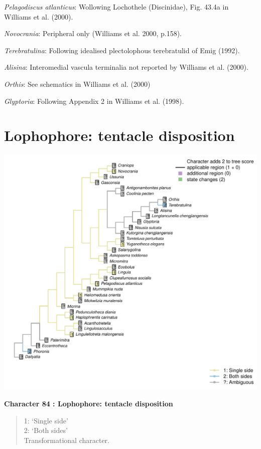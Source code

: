 \documentclass[]{book}
\theoremstyle{definition}
\theoremstyle{definition}
\theoremstyle{definition}
\theoremstyle{remark}
\begin{document}
\emph{Pelagodiscus atlanticus}: Wollowing Lochothele (Discinidae), Fig.
43.4a in Williams et al. (2000).

\emph{Novocrania}: Peripheral only (Williams et al. 2000, p.158).

\emph{Terebratulina}: Following idealised plectolophous terebratulid of
Emig (1992).

\emph{Alisina}: Interomedial vascula terminalia not reported by Williams
et al. (2000).

\emph{Orthis}: See schematics in Williams et al. (2000)

\emph{Glyptoria}: Following Appendix 2 in Williams et al. (1998).

\hypertarget{lophophore-tentacle-disposition}{%
\section*{Lophophore: tentacle
disposition}\label{lophophore-tentacle-disposition}}

\includegraphics{Brachiopod_phylogeny_files/figure-latex/unnamed-chunk-5-84.pdf}

\textbf{Character 84 : Lophophore: tentacle disposition }

\begin{quote}
1: `Single side'\\
2: `Both sides'\\
Transformational character.
\end{quote}
\end{document}
